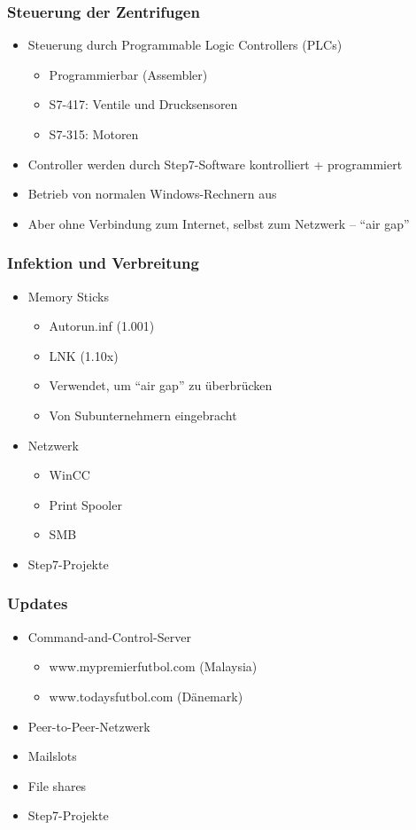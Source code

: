 \documentclass{beamer}
\begin{document}
\begin{frame}
  \frametitle{Steuerung der Zentrifugen}
  \begin{itemize}
    \item Steuerung durch Programmable Logic Controllers (PLCs)
      \begin{itemize}
        \item Programmierbar (Assembler)
        \item S7-417: Ventile und Drucksensoren
        \item S7-315: Motoren
      \end{itemize}
    \item Controller werden durch Step7-Software kontrolliert + programmiert
    \item Betrieb von normalen Windows-Rechnern aus
    \item Aber ohne Verbindung zum Internet, selbst zum Netzwerk – “air gap”
  \end{itemize}
\end{frame}

\begin{frame}
  \frametitle{Infektion und Verbreitung}
  \begin{itemize}
    \item Memory Sticks
      \begin{itemize}
        \item Autorun.inf (1.001)
        \item LNK (1.10x)
        \item Verwendet, um “air gap” zu überbrücken
        \item Von Subunternehmern eingebracht
      \end{itemize}
    \item Netzwerk
      \begin{itemize}
        \item WinCC
        \item Print Spooler
        \item SMB
      \end{itemize}
    \item Step7-Projekte
  \end{itemize}
\end{frame}

\begin{frame}
  \frametitle{Updates}
  \begin{itemize}
    \item Command-and-Control-Server
      \begin{itemize}
        \item www.mypremierfutbol.com (Malaysia)
        \item www.todaysfutbol.com (Dänemark)
      \end{itemize}
    \item Peer-to-Peer-Netzwerk
    \item Mailslots
    \item File shares
    \item Step7-Projekte
  \end{itemize}
\end{frame}
\end{document}
